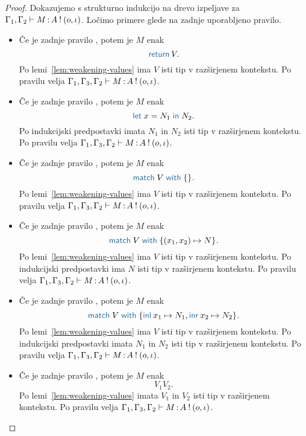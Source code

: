 \begin{proof}
	Dokazujemo s strukturno indukcijo na drevo izpeljave za $\Gamma_1, \Gamma_2 \vdash M \mathinner{:} A \mathbin{!} (o, \iota)$.
	Ločimo primere glede na zadnje uporabljeno pravilo.
	
	\begin{itemize}
		\item Če je zadnje pravilo , potem je $M$ enak $$\tmreturn{V}.$$
		Po lemi~\ref{lem:weakening-values} ima $V$ isti tip v razširjenem kontekstu.
		Po pravilu  velja $\Gamma_1, \Gamma_3, \Gamma_2 \vdash M \mathinner{:} A \mathbin{!} (o, \iota)$.
		
		\item Če je zadnje pravilo , potem je $M$ enak $$\tmlet{x}{N_1}{N_2}.$$
		Po indukcijski predpostavki imata $N_1$ in $N_2$ isti tip v razširjenem kontekstu.
		Po pravilu  velja $\Gamma_1, \Gamma_3, \Gamma_2 \vdash M \mathinner{:} A \mathbin{!} (o, \iota)$.
		
		\item Če je zadnje pravilo , potem je $M$ enak $$\tmmatch{V}{}.$$
		Po lemi~\ref{lem:weakening-values} ima $V$ isti tip v razširjenem kontekstu.
		Po pravilu  velja $\Gamma_1, \Gamma_3, \Gamma_2 \vdash M \mathinner{:} A \mathbin{!} (o, \iota)$.
		
		\item Če je zadnje pravilo , potem je $M$ enak $$\tmmatch{V}{(x_1,x_2) \mapsto N}.$$ 
		Po lemi~\ref{lem:weakening-values} ima $V$ isti tip v razširjenem kontekstu.
		Po indukcijski predpostavki ima $N$ isti tip v razširjenem kontekstu.
		Po pravilu  velja $\Gamma_1, \Gamma_3, \Gamma_2 \vdash M \mathinner{:} A \mathbin{!} (o, \iota)$.
		
		\item Če je zadnje pravilo , potem je $M$ enak $$\tmmatch{V}{\tminl{x_1} \mapsto N_1, \tminr{x_2} \mapsto N_2}.$$
		Po lemi~\ref{lem:weakening-values} ima $V$ isti tip v razširjenem kontekstu.
		Po indukcijski predpostavki imata $N_1$ in $N_2$ isti tip v razširjenem kontekstu.
		Po pravilu  velja $\Gamma_1, \Gamma_3, \Gamma_2 \vdash M \mathinner{:} A \mathbin{!} (o, \iota)$.
		
		\item Če je zadnje pravilo , potem je $M$ enak $$V_1 V_2.$$
		Po lemi~\ref{lem:weakening-values} imata $V_1$ in $V_2$ isti tip v razširjenem kontekstu.
		Po pravilu  velja $\Gamma_1, \Gamma_3, \Gamma_2 \vdash M \mathinner{:} A \mathbin{!} (o, \iota)$.
		

\end{itemize}
\end{proof}
